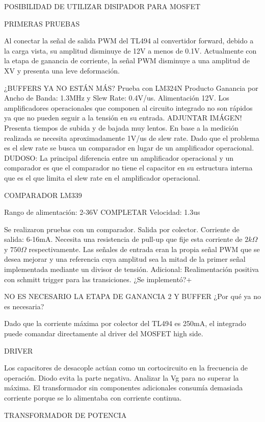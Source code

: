 POSIBILIDAD DE UTILIZAR DISIPADOR PARA MOSFET

PRIMERAS PRUEBAS

Al conectar la señal de salida PWM del TL494 al convertidor forward, debido a la carga vista, su amplitud disminuye de 12V a menos de 0.1V. 
Actualmente con la etapa de ganancia de corriente, la señal PWM disminuye a una amplitud de XV y presenta una leve deformación.

¿BUFFERS YA NO ESTÁN MÁS?
Prueba con LM324N
Producto Ganancia por Ancho de Banda: 1.3MHz y Slew Rate: 0.4V/us. 
Alimentación 12V. Los amplificadores operacionales que componen al circuito integrado no son rápidos ya que no pueden seguir a la tensión en su entrada. 
ADJUNTAR IMÁGEN!
Presenta tiempos de subida y de bajada muy lentos. En base a la medición realizada se necesita aproximadamente 1V/us de slew rate. 
Dado que el problema es el slew rate se busca un comparador en lugar de un amplificador operacional. 
DUDOSO:
La principal diferencia entre un amplificador operacional y un comparador es que el comparador
 no tiene el capacitor en su estructura interna que es el que limita el slew rate en el amplificador operacional. 

COMPARADOR LM339

Rango de alimentación: 2-36V
COMPLETAR
Velocidad: 1.3us

Se realizaron pruebas con un comparador. 
Salida por colector. Corriente de salida: 6-16mA. Necesita una resistencia de pull-up que fije esta corriente de $2k\Omega$ y $750\Omega$ respectivamente. 
Las señales de entrada eran la propia señal PWM que se desea mejorar y una referencia cuya amplitud 
sea la mitad de la primer señal implementada mediante un divisor de tensión. 
Adicional: Realimentación positiva con schmitt trigger para las transiciones. ¿Se implementó?+

NO ES NECESARIO LA ETAPA DE GANANCIA 2 Y BUFFER ¿Por qué ya no es necesaria?

Dado que la corriente máxima por colector del TL494 es 250mA, el integrado puede comandar directamente al driver del MOSFET high side. 

DRIVER

Los capacitores de desacople actúan como un cortocircuito en la frecuencia de operación. 
Diodo evita la parte negativa. 
Analizar la Vg para no superar la máxima. 
El transformador sin componentes adicionales consumía demasiada corriente porque se lo alimentaba con corriente continua. 

TRANSFORMADOR DE POTENCIA

